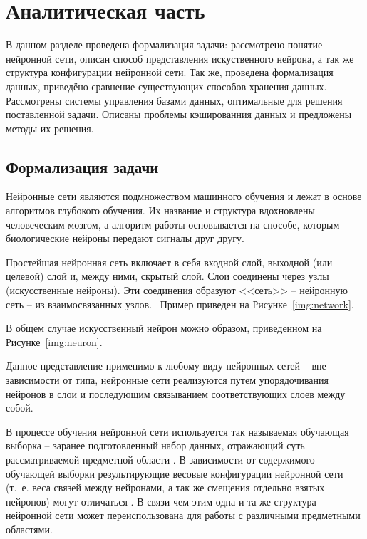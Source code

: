 \chapter{Аналитическая часть}

В данном разделе проведена формализация задачи: рассмотрено понятие нейронной сети, описан способ представления искуственного нейрона, а так же структура конфигурации нейронной сети. Так же, проведена формализация данных, приведёно сравнение существующих способов хранения данных. Рассмотрены системы управления базами данных, оптимальные для решения поставленной задачи. Описаны проблемы кэшированния данных и предложены методы их решения.

\section{Формализация задачи}

Нейронные сети являются подмножеством машинного обучения и лежат в основе алгоритмов глубокого обучения. Их название и структура вдохновлены человеческим мозгом, а алгоритм работы основывается на способе, которым биологические нейроны передают сигналы друг другу.~\cite{neural}

Простейшая нейронная сеть включает в себя входной слой, выходной (или целевой) слой и, между ними, скрытый слой. Слои соединены через узлы (искусственные нейроны). Эти соединения образуют <<сеть>> -- нейронную сеть -- из взаимосвязанных узлов.~\cite{sas-neural} Пример приведен на Рисунке~\ref{img:network}.


В общем случае искусственный нейрон можно образом, приведенном на Рисунке~\ref{img:neuron}.


Данное представление применимо к любому виду нейронных сетей -- вне зависимости от типа, нейронные сети реализуются путем упорядочивания нейронов в слои и последующим связыванием соответствующих слоев между собой. \cite{sharkawy-neural}

В процессе обучения нейронной сети используется так называемая обучающая выборка -- заранее подготовленный набор данных, отражающий суть рассматриваемой предметной области \cite{sharkawy-neural}. В зависимости от содержимого обучающей выборки результирующие весовые конфигурации нейронной сети (т.~е. веса связей между нейронами, а так же смещения отдельно взятых нейронов) могут отличаться \cite{mit-neural}. В связи чем этим одна и та же структура нейронной сети может переиспользована для работы с различными предметными областями.

